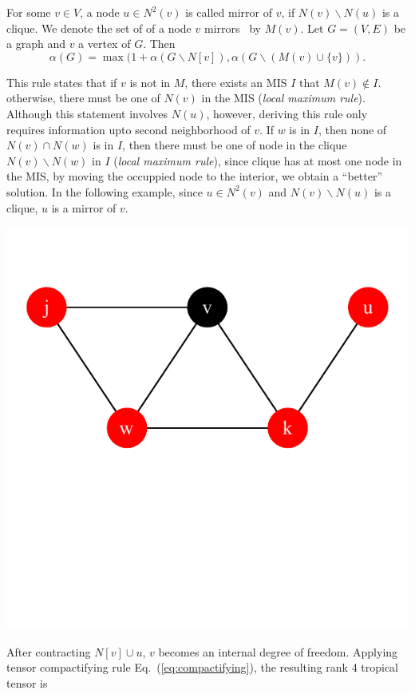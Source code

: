 \documentclass[review,onefignum,onetabnum]{siamart190516}
\newcommand{\<}{\langle}
\renewcommand{\>}{\rangle}
\newcommand{\Eq}[1]{Eq.~(\ref{#1})}
\newcounter{example}
\begin{document}

\begin{corollary} %
For some $v \in V$, a node $u \in N^2(v)$ is called mirror of $v$, if $N(v) \backslash N(u)$ is a clique. We denote the set of of a node $v$ mirrors~\cite{Fomin2013} by $M(v)$.
Let $G = (V, E)$ be a graph and $v$ a vertex of $G$. Then
\begin{equation}
\alpha(G) = \max(1 + \alpha(G \backslash N[v]), \alpha(G \backslash (M(v) \cup \{v\})).
\end{equation}
\end{corollary}

This rule states that if $v$ is not in $M$, there exists an MIS $I$ that $M(v)\notin I$.
otherwise, there must be one of $N(v)$ in the MIS (\textit{local maximum rule}).
Although this statement involves $N(u)$, however, deriving this rule only requires information upto second neighborhood of $v$.
If $w$ is in $I$, then none of $N(v) \cap N(w)$ is in $I$, then there must be one of node in the clique $N(v)\backslash N(w)$ in $I$ (\textit{local maximum rule}),
since clique has at most one node in the MIS, by moving the occuppied node to the interior, we obtain a ``better'' solution.
In the following example, since $u\in N^2(v)$ and $N(v) \backslash N(u)$ is a clique, $u$ is a mirror of $v$.

\centerline{\includegraphics[width=0.4\columnwidth,trim={0 3.5cm 0 1cm},clip]{../notebooks/mirror.pdf}}

After contracting $N[v]\cup u$, $v$ becomes an internal degree of freedom.
Applying tensor compactifying rule \Eq{eq:compactifying}, the resulting rank 4 tropical tensor is
\end{document}
